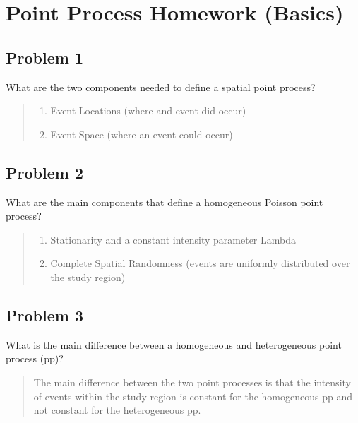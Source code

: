 \documentclass[
  letterpaper,
  DIV=11,
  numbers=noendperiod]{scrartcl}
\providecommand{\tightlist}{%
  \setlength{\itemsep}{0pt}\setlength{\parskip}{0pt}}\usepackage{longtable,booktabs,array}
\begin{document}
\hypertarget{point-process-homework-basics}{%
\section{Point Process Homework
(Basics)}\label{point-process-homework-basics}}

\hypertarget{problem-1}{%
\subsection{Problem 1}\label{problem-1}}

What are the two components needed to define a spatial point process?

\begin{quote}
\begin{enumerate}
\def\labelenumi{\arabic{enumi}.}
\tightlist
\item
  Event Locations (where and event did occur)
\item
  Event Space (where an event could occur)
\end{enumerate}
\end{quote}

\hypertarget{problem-2}{%
\subsection{Problem 2}\label{problem-2}}

What are the main components that define a homogeneous Poisson point
process?

\begin{quote}
\begin{enumerate}
\def\labelenumi{\arabic{enumi}.}
\tightlist
\item
  Stationarity and a constant intensity parameter Lambda
\item
  Complete Spatial Randomness (events are uniformly distributed over the
  study region)
\end{enumerate}
\end{quote}

\hypertarget{problem-3}{%
\subsection{Problem 3}\label{problem-3}}

What is the main difference between a homogeneous and heterogeneous
point process (pp)?

\begin{quote}
The main difference between the two point processes is that the
intensity of events within the study region is constant for the
homogeneous pp and not constant for the heterogeneous pp.
\end{quote}
\end{document}
